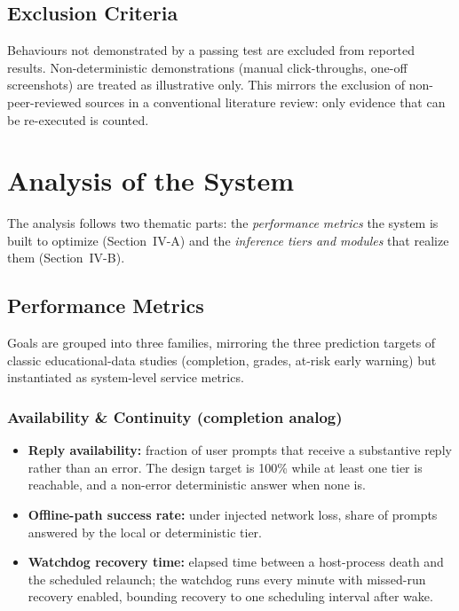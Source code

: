 \documentclass[conference]{IEEEtran}
\begin{document}
\subsection{Exclusion Criteria}

Behaviours not demonstrated by a passing test are excluded from
reported results. Non-deterministic demonstrations (manual
click-throughs, one-off screenshots) are treated as illustrative
only. This mirrors the exclusion of non-peer-reviewed sources in
a conventional literature review: only evidence that can be
re-executed is counted.

\section{Analysis of the System}

The analysis follows two thematic parts: the \emph{performance
metrics} the system is built to optimize
(Section~IV-A) and the \emph{inference tiers and modules} that
realize them (Section~IV-B).

\subsection{Performance Metrics}

Goals are grouped into three families, mirroring the three
prediction targets of classic educational-data studies
(completion, grades, at-risk early warning) but instantiated as
system-level service metrics.

\subsubsection{Availability \& Continuity (completion analog)}
\begin{itemize}
  \item \textbf{Reply availability:} fraction of user prompts
  that receive a substantive reply rather than an error. The
  design target is 100\% while at least one tier is reachable,
  and a non-error deterministic answer when none is.
  \item \textbf{Offline-path success rate:} under injected
  network loss, share of prompts answered by the local or
  deterministic tier.
  \item \textbf{Watchdog recovery time:} elapsed time between a
  host-process death and the scheduled relaunch; the watchdog
  runs every minute with missed-run recovery enabled, bounding
  recovery to one scheduling interval after wake.
\end{itemize}
\end{document}
